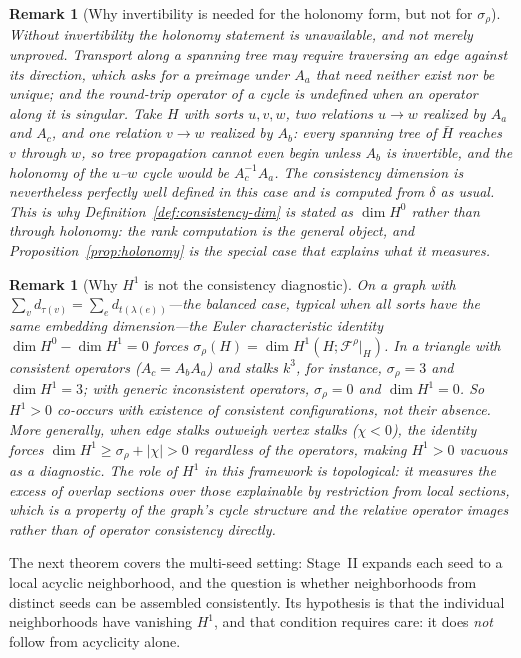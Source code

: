 \documentclass[11pt]{article}
\newtheorem{remark}[definition]{Remark}
\newcommand{\F}{\mathcal{F}}
\begin{document}
\begin{remark}[Why invertibility is needed for the holonomy form, but not for $\sigma_\rho$]
\label{rem:holonomy-caveat}
Without invertibility the holonomy statement is unavailable, and not merely unproved. Transport along a spanning tree may require traversing an edge against its direction, which asks for a preimage under $A_a$ that need neither exist nor be unique; and the round-trip operator of a cycle is undefined when an operator along it is singular. Take $H$ with sorts $u,v,w$, two relations $u\to w$ realized by $A_a$ and $A_c$, and one relation $v\to w$ realized by $A_b$: every spanning tree of $\bar H$ reaches $v$ through $w$, so tree propagation cannot even begin unless $A_b$ is invertible, and the holonomy of the $u$--$w$ cycle would be $A_c^{-1}A_a$. The consistency dimension is nevertheless perfectly well defined in this case and is computed from $\delta$ as usual. This is why Definition~\ref{def:consistency-dim} is stated as $\dim H^0$ rather than through holonomy: the rank computation is the general object, and Proposition~\ref{prop:holonomy} is the special case that explains what it measures.
\end{remark}

\begin{remark}[Why $H^1$ is not the consistency diagnostic]
\label{rem:h1-not-obstruction}
On a graph with $\sum_{v}d_{\tau(v)}=\sum_{e}d_{t(\lambda(e))}$---the balanced case, typical when all sorts have the same embedding dimension---the Euler characteristic identity $\dim H^0-\dim H^1=0$ forces $\sigma_\rho(H)=\dim H^1(H;\F^{\rho}|_H)$. In a triangle with consistent operators ($A_c=A_bA_a$) and stalks $k^3$, for instance, $\sigma_\rho=3$ and $\dim H^1=3$; with generic inconsistent operators, $\sigma_\rho=0$ and $\dim H^1=0$. So $H^1>0$ co-occurs with \emph{existence} of consistent configurations, not their absence. More generally, when edge stalks outweigh vertex stalks ($\chi<0$), the identity forces $\dim H^1\ge\sigma_\rho+|\chi|>0$ regardless of the operators, making $H^1>0$ vacuous as a diagnostic. The role of $H^1$ in this framework is topological: it measures the excess of overlap sections over those explainable by restriction from local sections, which is a property of the graph's cycle structure and the relative operator images rather than of operator consistency directly.
\end{remark}

The next theorem covers the multi-seed setting: Stage~II expands each seed to a local acyclic neighborhood, and the question is whether neighborhoods from distinct seeds can be assembled consistently. Its hypothesis is that the individual neighborhoods have vanishing $H^1$, and that condition requires care: it does \emph{not} follow from acyclicity alone.
\end{document}
